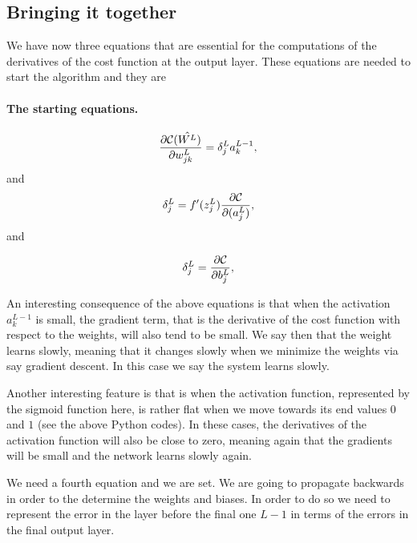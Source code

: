 \documentclass[%
oneside,                 %
final,                   %
10pt]{article}
\begin{document}
\subsection{Bringing it together}

We have now three equations that are essential for the computations of the derivatives of the cost function at the output layer. These equations are needed to start the algorithm and they are


\paragraph{The starting equations.}

\begin{equation}
\frac{\partial{\cal C}(\hat{W^L})}{\partial w_{jk}^L}  =  \delta_j^La_k^{L-1},
\end{equation}
and
\begin{equation}
\delta_j^L = f'(z_j^L)\frac{\partial {\cal C}}{\partial (a_j^L)},
\end{equation}
and

\begin{equation}
\delta_j^L = \frac{\partial {\cal C}}{\partial b_j^L},
\end{equation}




An interesting consequence of the above equations is that when the
activation $a_k^{L-1}$ is small, the gradient term, that is the
derivative of the cost function with respect to the weights, will also
tend to be small. We say then that the weight learns slowly, meaning
that it changes slowly when we minimize the weights via say gradient
descent. In this case we say the system learns slowly.

Another interesting feature is that is when the activation function,
represented by the sigmoid function here, is rather flat when we move towards
its end values $0$ and $1$ (see the above Python codes). In these
cases, the derivatives of the activation function will also be close
to zero, meaning again that the gradients will be small and the
network learns slowly again.



We need a fourth equation and we are set. We are going to propagate
backwards in order to the determine the weights and biases. In order
to do so we need to represent the error in the layer before the final
one $L-1$ in terms of the errors in the final output layer.
\end{document}
